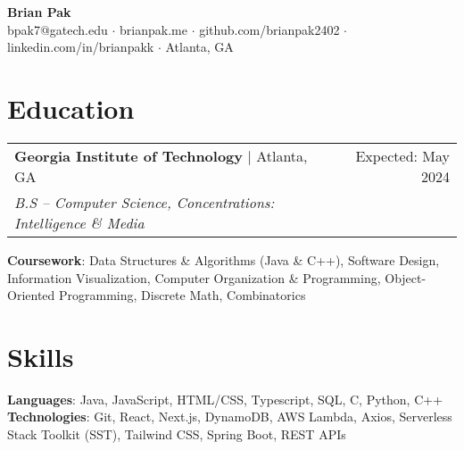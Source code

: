 \documentclass[letterpaper,11pt]{article}
\makeatletter
\newcommand{\resumeEducationHeading}[5]{
    \begin{tabular*}{0.99\textwidth}[t]{l@{\extracolsep{\fill}}r}
      \textbf{#1} $\vert$ #2 & #3 \\
      \textit{\small#4} & \textit{\small #5} \\
    \end{tabular*}\vspace{0.5pt}
}
\newcommand{\resumeExperienceHeading}[3]{
    \begin{tabular*}{0.99\textwidth}[t]{l@{\extracolsep{\fill}}r}
      \textbf{#1} $\vert$ {#2} & {#3} \\
    \end{tabular*}\vspace{-3pt}
}
\newcommand{\resumeItemListStart}{\begin{itemize}[noitemsep]\vspace{-4pt}}
\newcommand{\resumeItemListEnd}{\end{itemize}}
\makeatother
\begin{document}
\begin{center}
  \textbf{\huge Brian Pak} \\
  \vspace*{0.1cm}
  {bpak7@gatech.edu} $\cdot$ {brianpak.me} $\cdot$ {github.com/brianpak2402} $\cdot$ {linkedin.com/in/brianpakk}  $\cdot$ Atlanta, GA
\end{center}

\section{Education}
    \resumeEducationHeading
      {Georgia Institute of Technology}{Atlanta, GA}{Expected: May 2024}
      {B.S -- Computer Science, Concentrations: Intelligence \& Media}{\vspace{0.1cm}} 
    \textbf{Coursework}{: Data Structures \& Algorithms (Java \& C++), Software Design, Information Visualization, Computer Organization \& Programming, Object-Oriented Programming, Discrete Math, Combinatorics} \\

  
\section{Skills}
    \textbf{Languages}{: Java, JavaScript, HTML/CSS, Typescript, SQL, C, Python, C++} \\
    \textbf{Technologies}{: Git, React, Next.js,  DynamoDB, AWS Lambda, Axios, Serverless Stack Toolkit (SST), Tailwind CSS, Spring Boot, REST APIs}
\end{document}
